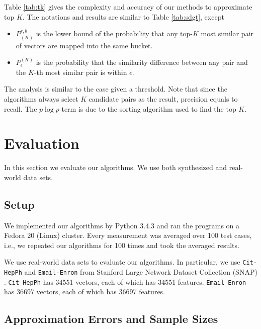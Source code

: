 \documentclass{article}
\begin{document}
Table \ref{tab:tk} gives the complexity and accuracy of our methods to approximate top $K$. The notations and results are similar to Table \ref{tab:sdgt}, except
\begin{itemize}
\item $P_{(K)}^{r,b}$ is the lower bound of the probability that any top-$K$ most similar pair of vectors are mapped into the same bucket. 
\item $P_\epsilon^{(K)}$ is the probability that the similarity difference between any pair and the $K$-th most similar pair is within $\epsilon$.
\end{itemize}
The analysis is similar to the case given a threshold. Note that since the algorithms always select $K$ candidate pairs as the result, precision equals to recall. The $p \log p$ term is due to the sorting algorithm used to find the top $K$.

\section{Evaluation}
\label{sec:eval}
In this section we evaluate our algorithms. We use both synthesized and real-world data sets.

\subsection{Setup}
We implemented our algorithms by Python 3.4.3 and ran the programs on a Fedora 20 (Linux) cluster. Every measurement was averaged over 100 test cases, i.e., we repeated our algorithms for 100 times and took the averaged results.

We use real-world data sets to evaluate our algorithms. 
In particular, we use \texttt{Cit-HepPh} and \texttt{Email-Enron} from Stanford Large Network Dataset Collection (SNAP) \cite{LK15}. \texttt{Cit-HepPh} has 34551 vectors, each of which has 34551 features. \texttt{Email-Enron} has 36697 vectors, each of which has 36697 features.


\subsection{Approximation Errors and Sample Sizes}
\end{document}
